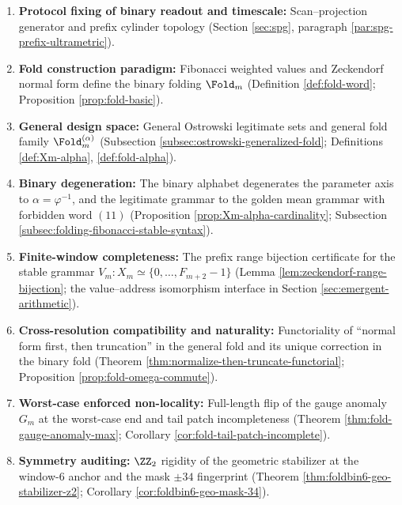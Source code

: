 \begin{enumerate}
  \item \textbf{Protocol fixing of binary readout and timescale:} Scan--projection generator and prefix cylinder topology (Section \ref{sec:spg}, paragraph \ref{par:spg-prefix-ultrametric}).
  \item \textbf{Fold construction paradigm:} Fibonacci weighted values and Zeckendorf normal form define the binary folding \(\Fold_m\) (Definition \ref{def:fold-word}; Proposition \ref{prop:fold-basic}).
  \item \textbf{General design space:} General Ostrowski legitimate sets and general fold family \(\Fold_m^{(\alpha)}\) (Subsection \ref{subsec:ostrowski-generalized-fold}; Definitions \ref{def:Xm-alpha}, \ref{def:fold-alpha}).
  \item \textbf{Binary degeneration:} The binary alphabet degenerates the parameter axis to \(\alpha=\varphi^{-1}\), and the legitimate grammar to the golden mean grammar with forbidden word \((11)\) (Proposition \ref{prop:Xm-alpha-cardinality}; Subsection \ref{subsec:folding-fibonacci-stable-syntax}).
  \item \textbf{Finite-window completeness:} The prefix range bijection certificate for the stable grammar \(V_m:X_m\simeq\{0,\dots,F_{m+2}-1\}\) (Lemma \ref{lem:zeckendorf-range-bijection}; the value--address isomorphism interface in Section \ref{sec:emergent-arithmetic}).
  \item \textbf{Cross-resolution compatibility and naturality:} Functoriality of ``normal form first, then truncation'' in the general fold and its unique correction in the binary fold (Theorem \ref{thm:normalize-then-truncate-functorial}; Proposition \ref{prop:fold-omega-commute}).
  \item \textbf{Worst-case enforced non-locality:} Full-length flip of the gauge anomaly \(G_m\) at the worst-case end and tail patch incompleteness (Theorem \ref{thm:fold-gauge-anomaly-max}; Corollary \ref{cor:fold-tail-patch-incomplete}).
  \item \textbf{Symmetry auditing:} \(\ZZ_2\) rigidity of the geometric stabilizer at the window-\(6\) anchor and the mask \(\pm 34\) fingerprint (Theorem \ref{thm:foldbin6-geo-stabilizer-z2}; Corollary \ref{cor:foldbin6-geo-mask-34}).
\end{enumerate}

